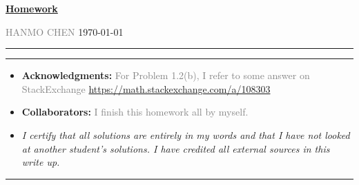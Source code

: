 \documentclass[a4paper]{article}
\begin{document}
\courseheader



\setcounter{hwcnt}{1} %

\begin{center}
  \underline{\bf Homework \thehwcnt} \\
\end{center}
\begin{flushleft}
  \textcolor{gray}{HANMO CHEN}\hfill
  \today
\end{flushleft}
\hrule

\vspace{2em}


\newcommand{\EX}{\mathbb{E}}

\flushleft
\rule{\textwidth}{1pt}
\begin{itemize}
\item {\bf Acknowledgments: \/} 
  \textcolor{gray}{For Problem 1.2(b), I refer to some answer on StackExchange \small{\url{https://math.stackexchange.com/a/108303}}}

\item {\bf Collaborators: \/}
  \textcolor{gray}{I finish this homework all by myself.} 
\item  \emph{I certify that all solutions are entirely in my words and that I have not looked at another student's solutions. I have credited all external sources in this write up.}


  \framebox[\linewidth]{\rule{0pt}{10pt}\textcolor{gray}{\large Hanmo Chen}}
\end{itemize}
\rule{\textwidth}{1pt}
\end{document}
